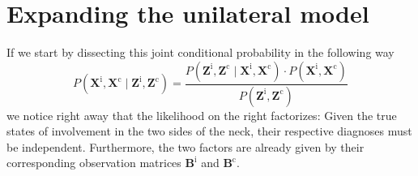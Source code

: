 \documentclass[\relativeRoot/main.tex]{subfiles}
\begin{document}
\section{Expanding the unilateral model}
\label{sec:bilateral:expand}

If we start by dissecting this joint conditional probability in the following way
%
\begin{equation} \label{eq:hmm_bilateral_bayes}
    P \left( \mathbf{X}^\text{i}, \mathbf{X}^\text{c} \mid \mathbf{Z}^\text{i}, \mathbf{Z}^\text{c} \right) = \frac{P \left( \mathbf{Z}^\text{i}, \mathbf{Z}^\text{c} \mid \mathbf{X}^\text{i}, \mathbf{X}^\text{c} \right) \cdot P \left( \mathbf{X}^\text{i}, \mathbf{X}^\text{c} \right)}{P \left( \mathbf{Z}^\text{i}, \mathbf{Z}^\text{c} \right)}
\end{equation}
%
we notice right away that the likelihood on the right factorizes: Given the true states of involvement in the two sides of the neck, their respective diagnoses must be independent. Furthermore, the two factors are already given by their corresponding observation matrices $\mathbf{B}^\text{i}$ and $\mathbf{B}^\text{c}$.
\end{document}

